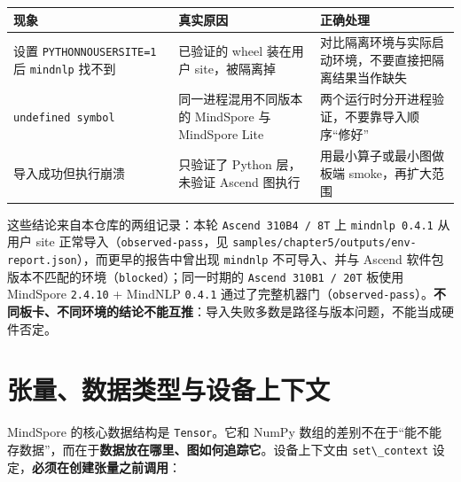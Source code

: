 \begin{longtable}[]{@{}
  >{\raggedright\arraybackslash}p{}
  >{\raggedright\arraybackslash}p{}
  >{\raggedright\arraybackslash}p{}@{}}
\toprule\noalign{}
\begin{minipage}[b]{\linewidth}\raggedright
现象
\end{minipage} & \begin{minipage}[b]{\linewidth}\raggedright
真实原因
\end{minipage} & \begin{minipage}[b]{\linewidth}\raggedright
正确处理
\end{minipage} \\
\midrule\noalign{}
\endhead
\bottomrule\noalign{}
\endlastfoot
设置 \passthrough{\lstinline!PYTHONNOUSERSITE=1!} 后
\passthrough{\lstinline!mindnlp!} 找不到 & 已验证的 wheel 装在用户
site，被隔离掉 &
对比隔离环境与实际启动环境，不要直接把隔离结果当作缺失 \\
\passthrough{\lstinline!undefined symbol!} & 同一进程混用不同版本的
MindSpore 与 MindSpore Lite &
两个运行时分开进程验证，不要靠导入顺序``修好'' \\
导入成功但执行崩溃 & 只验证了 Python 层，未验证 Ascend 图执行 &
用最小算子或最小图做板端 smoke，再扩大范围 \\
\end{longtable}

这些结论来自本仓库的两组记录：本轮
\passthrough{\lstinline!Ascend 310B4 / 8T!} 上
\passthrough{\lstinline!mindnlp 0.4.1!} 从用户 site
正常导入（\passthrough{\lstinline!observed-pass!}，见
\passthrough{\lstinline!samples/chapter5/outputs/env-report.json!}），而更早的报告中曾出现
\passthrough{\lstinline!mindnlp!} 不可导入、并与 Ascend
软件包版本不匹配的环境（\passthrough{\lstinline!blocked!}）；同一时期的
\passthrough{\lstinline!Ascend 310B1 / 20T!} 板使用 MindSpore
\passthrough{\lstinline!2.4.10!} + MindNLP
\passthrough{\lstinline!0.4.1!}
通过了完整机器门（\passthrough{\lstinline!observed-pass!}）。\textbf{不同板卡、不同环境的结论不能互推}：导入失败多数是路径与版本问题，不能当成硬件否定。

\section{张量、数据类型与设备上下文}\label{src-book-chapter5-h9}

MindSpore 的核心数据结构是 \passthrough{\lstinline!Tensor!}。它和 NumPy
数组的差别不在于``能不能存数据''，而在于\textbf{数据放在哪里、图如何追踪它}。设备上下文由
\passthrough{\lstinline!set\_context!}
设定，\textbf{必须在创建张量之前调用}：

